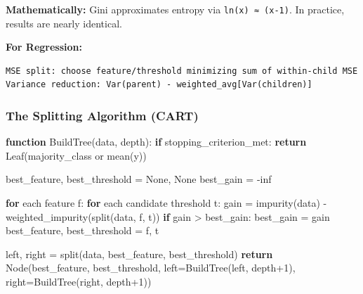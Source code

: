 \documentclass[11pt]{article}
\newenvironment{Shaded}{\begin{snugshade}}{\end{snugshade}}
\newcommand{\BuiltInTok}[1]{\textcolor[rgb]{0.50,0.55,0.55}{#1}}
\newcommand{\ControlFlowTok}[1]{\textcolor[rgb]{0.99,0.74,0.29}{\textbf{#1}}}
\newcommand{\DecValTok}[1]{\textcolor[rgb]{0.96,0.45,0.00}{#1}}
\newcommand{\FunctionTok}[1]{\textcolor[rgb]{0.56,0.27,0.68}{#1}}
\newcommand{\KeywordTok}[1]{\textcolor[rgb]{0.81,0.81,0.76}{\textbf{#1}}}
\newcommand{\NormalTok}[1]{\textcolor[rgb]{0.81,0.81,0.76}{#1}}
\newcommand{\OperatorTok}[1]{\textcolor[rgb]{0.81,0.81,0.76}{#1}}
\begin{document}
\textbf{Mathematically:} Gini approximates entropy via \texttt{ln(x)\ ≈\ (x-1)}. In practice, results are nearly identical.

\textbf{For Regression:}

\setcodelang{}

\begin{verbatim}
MSE split: choose feature/threshold minimizing sum of within-child MSE
Variance reduction: Var(parent) - weighted_avg[Var(children)]
\end{verbatim}

\subsubsection{The Splitting Algorithm (CART)}\label{the-splitting-algorithm-cart}


\begin{Shaded}
\begin{Highlighting}[]
\KeywordTok{function} \FunctionTok{BuildTree}\NormalTok{(data}\OperatorTok{,}\NormalTok{ depth)}\OperatorTok{:}
    \ControlFlowTok{if}\NormalTok{ stopping\_criterion\_met}\OperatorTok{:}
        \ControlFlowTok{return} \FunctionTok{Leaf}\NormalTok{(majority\_class or }\FunctionTok{mean}\NormalTok{(y))}
    
\NormalTok{    best\_feature}\OperatorTok{,}\NormalTok{ best\_threshold }\OperatorTok{=}\NormalTok{ None}\OperatorTok{,}\NormalTok{ None}
\NormalTok{    best\_gain }\OperatorTok{=} \OperatorTok{{-}}\NormalTok{inf}
    
    \ControlFlowTok{for}\NormalTok{ each feature f}\OperatorTok{:}
        \ControlFlowTok{for}\NormalTok{ each candidate threshold t}\OperatorTok{:}
\NormalTok{            gain }\OperatorTok{=} \FunctionTok{impurity}\NormalTok{(data) }\OperatorTok{{-}} \FunctionTok{weighted\_impurity}\NormalTok{(}\FunctionTok{split}\NormalTok{(data}\OperatorTok{,}\NormalTok{ f}\OperatorTok{,}\NormalTok{ t))}
            \ControlFlowTok{if}\NormalTok{ gain }\OperatorTok{\textgreater{}}\NormalTok{ best\_gain}\OperatorTok{:}
\NormalTok{                best\_gain }\OperatorTok{=}\NormalTok{ gain}
\NormalTok{                best\_feature}\OperatorTok{,}\NormalTok{ best\_threshold }\OperatorTok{=}\NormalTok{ f}\OperatorTok{,}\NormalTok{ t}
    
\NormalTok{    left}\OperatorTok{,}\NormalTok{ right }\OperatorTok{=} \FunctionTok{split}\NormalTok{(data}\OperatorTok{,}\NormalTok{ best\_feature}\OperatorTok{,}\NormalTok{ best\_threshold)}
    \ControlFlowTok{return} \BuiltInTok{Node}\NormalTok{(best\_feature}\OperatorTok{,}\NormalTok{ best\_threshold}\OperatorTok{,}
\NormalTok{                left}\OperatorTok{=}\FunctionTok{BuildTree}\NormalTok{(left}\OperatorTok{,}\NormalTok{ depth}\OperatorTok{+}\DecValTok{1}\NormalTok{)}\OperatorTok{,}
\NormalTok{                right}\OperatorTok{=}\FunctionTok{BuildTree}\NormalTok{(right}\OperatorTok{,}\NormalTok{ depth}\OperatorTok{+}\DecValTok{1}\NormalTok{))}
\end{Highlighting}
\end{Shaded}
\end{document}
